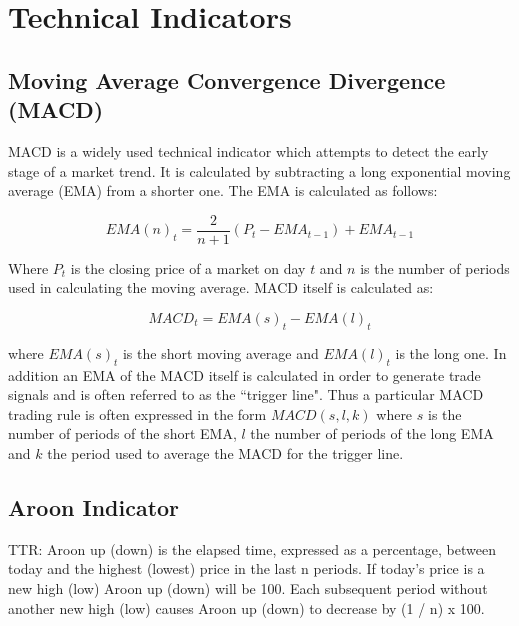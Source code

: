 
\chapter{Technical Indicators} %

\label{AppendixB} %



\section{Moving Average Convergence Divergence (MACD)}
\label{appB:MACD}
MACD is a widely used technical indicator which attempts to detect the early stage of a market trend. It is calculated by subtracting a long exponential moving average (EMA) from a shorter one. The EMA is calculated as follows:

\[ EMA(n)_{t} = \dfrac{2}{n+1}(P_{t}-EMA_{t-1}) + EMA_{t-1}\]

Where $ P_{t} $ is the closing price of a market on day $ t $ and $ n $ is the number of periods used in calculating the moving average. MACD itself is calculated as:

\[ MACD_{t} = EMA(s)_{t} - EMA(l)_{t} \]

where $ EMA(s)_{t} $ is the short moving average and $ EMA(l)_{t} $ is the long one. In addition an EMA of the MACD itself is calculated in order to generate trade signals and is often referred to as the \textquotedblleft trigger line". Thus a particular MACD trading rule is often expressed in the form $ MACD(s,l,k) $ where $ s $ is the number of periods of the short EMA, $ l $ the number of periods of the long EMA and $ k $ the period used to average the MACD for the trigger line.

\section{Aroon Indicator}
\label{appB:aroon}

TTR:
Aroon up (down) is the elapsed time, expressed as a percentage, between today and the highest (lowest) price in the last n periods. If today’s price is a new high (low) Aroon up (down) will be 100. Each subsequent period without another new high (low) causes Aroon up (down) to decrease by (1 / n) x 100.

